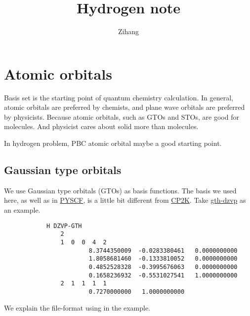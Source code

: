 \documentclass{article}
\title{Hydrogen note}
\author{Zihang}
\begin{document}
\maketitle
\section{Atomic orbitals}
    Basis set is the starting point of quantum chemistry calculation.
    In general, atomic orbitals are preferred by chemists,
    and plane wave orbitals are preferred by physicists.
    Because atomic orbitals, such as GTOs and STOs, are good for molecules.
    And physicist cares about solid more than molecules.

    In hydrogen problem, PBC atomic orbital maybe a good starting point.
    
    \subsection{Gaussian type orbitals}
        We use Gaussian type orbitals (GTOs) as basis functions.
        The basis we used here, as well as in \href{https://pyscf.org/}{PYSCF},
        is a little bit different from \href{https://www.cp2k.org/basis_sets}{CP2K}.
        Take \href{https://github.com/pyscf/pyscf/blob/master/pyscf/pbc/gto/basis/gth-dzvp.dat}{gth-dzvp} as an example.
        \begin{lstlisting}
            H DZVP-GTH
                2
                1  0  0  4  2
                        8.3744350009  -0.0283380461   0.0000000000
                        1.8058681460  -0.1333810052   0.0000000000
                        0.4852528328  -0.3995676063   0.0000000000
                        0.1658236932  -0.5531027541   1.0000000000
                2  1  1  1  1
                        0.7270000000   1.0000000000
        \end{lstlisting}
        We explain the file-format using in the example.
\end{document}

